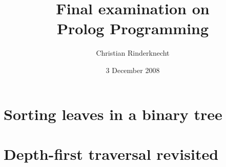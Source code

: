 \documentclass[11pt,a4paper]{article}
\title{Final examination on\\ Prolog Programming}
\author{Christian Rinderknecht}
\date{3 December 2008}
\begin{document}
\maketitle
\thispagestyle{empty}

\section{Sorting leaves in a binary tree}


\section{Depth-first traversal revisited}

\end{document}
